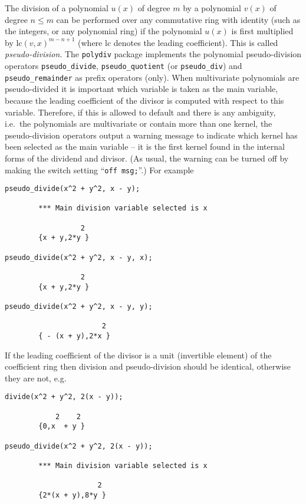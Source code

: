 \documentclass[11pt]{article}
\begin{document}
The division of a polynomial $u(x)$ of degree $m$ by a polynomial
$v(x)$ of degree $n \le m$ can be performed over any commutative ring
with identity (such as the integers, or any polynomial ring) if the
polynomial $u(x)$ is first multiplied by $\mathrm{lc}(v,x)^{m-n+1}$
(where lc denotes the leading coefficient).  This is called
\emph{pseudo-division}.  The \texttt{polydiv} package implements the
polynomial pseudo-division operators \texttt{pseudo\_divide},
\texttt{pseudo\_quotient} (or \texttt{pseudo\_div}) and
\texttt{pseudo\_remainder} as prefix operators (only).  When
multivariate polynomials are pseudo-divided it is important which
variable is taken as the main variable, because the leading
coefficient of the divisor is computed with respect to this variable.
Therefore, if this is allowed to default and there is any ambiguity,
i.e.\ the polynomials are multivariate or contain more than one
kernel, the pseudo-division operators output a warning message to
indicate which kernel has been selected as the main variable -- it is
the first kernel found in the internal forms of the dividend and
divisor.  (As usual, the warning can be turned off by making the
switch setting ``\texttt{off msg;}''.)  For example
\begin{verbatim}
pseudo_divide(x^2 + y^2, x - y);

        *** Main division variable selected is x 

                  2
        {x + y,2*y }

pseudo_divide(x^2 + y^2, x - y, x);

                  2
        {x + y,2*y }

pseudo_divide(x^2 + y^2, x - y, y);

                       2
        { - (x + y),2*x }
\end{verbatim}

If the leading coefficient of the divisor is a unit (invertible
element) of the coefficient ring then division and pseudo-division
should be identical, otherwise they are not, e.g.
\begin{verbatim}
divide(x^2 + y^2, 2(x - y));

            2    2
        {0,x  + y }

pseudo_divide(x^2 + y^2, 2(x - y));

        *** Main division variable selected is x

                      2
        {2*(x + y),8*y }
\end{verbatim}
\end{document}
